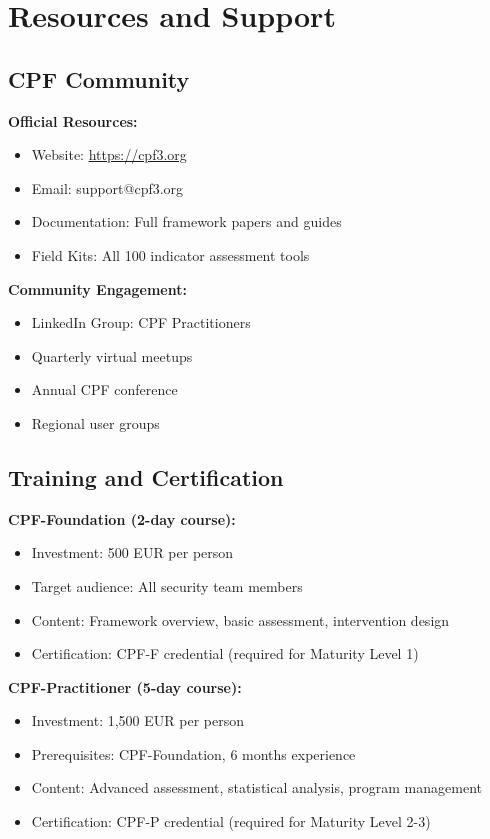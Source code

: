\documentclass[11pt,a4paper]{article}
\begin{document}
\section{Resources and Support}

\subsection{CPF Community}

\textbf{Official Resources:}
\begin{itemize}
\item Website: \url{https://cpf3.org}
\item Email: support@cpf3.org
\item Documentation: Full framework papers and guides
\item Field Kits: All 100 indicator assessment tools
\end{itemize}

\textbf{Community Engagement:}
\begin{itemize}
\item LinkedIn Group: CPF Practitioners
\item Quarterly virtual meetups
\item Annual CPF conference
\item Regional user groups
\end{itemize}

\subsection{Training and Certification}

\textbf{CPF-Foundation (2-day course):}
\begin{itemize}
\item Investment: 500 EUR per person
\item Target audience: All security team members
\item Content: Framework overview, basic assessment, intervention design
\item Certification: CPF-F credential (required for Maturity Level 1)
\end{itemize}

\textbf{CPF-Practitioner (5-day course):}
\begin{itemize}
\item Investment: 1,500 EUR per person
\item Prerequisites: CPF-Foundation, 6 months experience
\item Content: Advanced assessment, statistical analysis, program management
\item Certification: CPF-P credential (required for Maturity Level 2-3)
\end{itemize}
\end{document}
